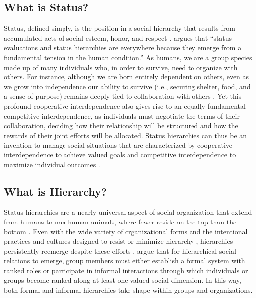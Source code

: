 \subsection{What is Status?}

Status, defined simply, is the position in a social hierarchy that results from accumulated acts of social esteem, honor, and respect \citep{Goode-1978-Celebration, Whyte-1943-Street, Ridgeway-1987-Nonverbal, Ridgeway-2019-Status}. \citet[p. 2]{Ridgeway-2019-Status} argues that ``status evaluations and status hierarchies are everywhere because they emerge from a fundamental tension in the human condition.'' As humans, we are a group species made up of many individuals who, in order to survive, need to organize with others. For instance, although we are born entirely dependent on others, even as we grow into independence our ability to survive (i.e., securing shelter, food, and a sense of purpose) remains deeply tied to collaboration with others \citep{Halevy-2011-Functional}. Yet this profound cooperative interdependence also gives rise to an equally fundamental competitive interdependence, as individuals must negotiate the terms of their collaboration, deciding how their relationship will be structured and how the rewards of their joint efforts will be allocated. Status hierarchies can thus be an invention to manage social situations that are characterized by cooperative interdependence to achieve valued goals and competitive interdependence to maximize individual outcomes \citep{Ridgeway-2019-Status}.

\subsection{What is Hierarchy?}

Status hierarchies are a nearly universal aspect of social organization that extend from humans to non-human animals, where fewer reside on the top than the bottom \citep{Halevy-2011-Functional, Magee-2008-SocialHierarchy, Sapolsky-2005-Influence}. Even with the wide variety of organizational forms \citep{Powell-1990-Neither, Carroll-2004-Demography} and the intentional practices and cultures designed to resist or minimize hierarchy \citep{Rothschild-1979-Collectivist, Morand-2001-Processes}, hierarchies persistently reemerge despite these efforts \citep{Leavitt-2005-Top, Tannenbaum-1974-Hierarchy}. \citet{Magee-2008-SocialHierarchy} argue that for hierarchical social relations to emerge, group members must either establish a formal system with ranked roles or participate in informal interactions through which individuals or groups become ranked along at least one valued social dimension. In this way, both formal and informal hierarchies take shape within groups and organizations.

